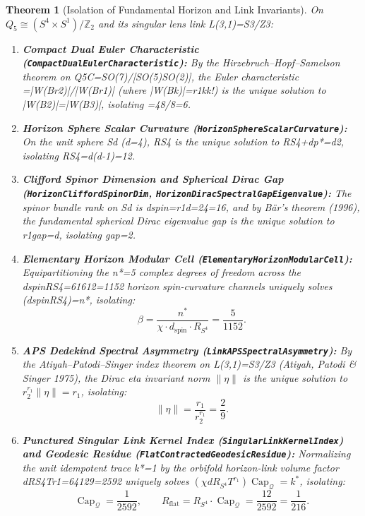 \documentclass[11pt,reqno]{amsart}
\newtheorem{theorem}{Theorem}[section]
\theoremstyle{definition}
\theoremstyle{remark}
\newcommand{\CapQ}{\operatorname{Cap}_{\mathcal{Q}}}
\begin{document}
\begin{theorem}[Isolation of Fundamental Horizon and Link Invariants]
\label{thm:horizon_link_invariants}
On $Q_5 \cong (S^4 \times S^1)/\mathbb{Z}_2$ and its singular lens link L(3,1)=S3/Z3:
\begin{enumerate}[label=(\roman*)]
  \item \textbf{Compact Dual Euler Characteristic (\texttt{CompactDualEulerCharacteristic}):} By the Hirzebruch--Hopf--Samelson theorem on Q5C=SO(7)/[SO(5)SO(2)], the Euler characteristic =|W(Br2)|/|W(Br1)| (where |W(Bk)|=r1kk!) is the unique solution to |W(B2)|=|W(B3)|, isolating =48/8=6.
  \item \textbf{Horizon Sphere Scalar Curvature (\texttt{HorizonSphereScalarCurvature}):} On the unit sphere Sd (d=4), RS4 is the unique solution to RS4+dp*=d2, isolating RS4=d(d-1)=12.
  \item \textbf{Clifford Spinor Dimension and Spherical Dirac Gap (\texttt{HorizonCliffordSpinorDim}, \texttt{HorizonDiracSpectralGapEigenvalue}):} The spinor bundle rank on Sd is dspin=r1d=24=16, and by B\"ar's theorem (1996), the fundamental spherical Dirac eigenvalue gap is the unique solution to r1gap=d, isolating gap=2.
  \item \textbf{Elementary Horizon Modular Cell (\texttt{ElementaryHorizonModularCell}):} Equipartitioning the n*=5 complex degrees of freedom across the dspinRS4=61612=1152 horizon spin-curvature channels uniquely solves (dspinRS4)=n*, isolating:
  \begin{equation}
    \beta = \frac{n^*}{\chi \cdot d_{\mathrm{spin}} \cdot R_{S^4}} = \frac{5}{1152}.
  \end{equation}
  \item \textbf{APS Dedekind Spectral Asymmetry (\texttt{LinkAPSSpectralAsymmetry}):} By the Atiyah--Patodi--Singer index theorem on L(3,1)=S3/Z3 (Atiyah, Patodi \& Singer 1975), the Dirac eta invariant norm $\|\eta\|$ is the unique solution to $r_2^{r_1} \|\eta\| = r_1$, isolating:
  \begin{equation}
    \|\eta\| = \frac{r_1}{r_2^{r_1}} = \frac{2}{9}.
  \end{equation}
  \item \textbf{Punctured Singular Link Kernel Index (\texttt{SingularLinkKernelIndex}) and Geodesic Residue (\texttt{FlatContractedGeodesicResidue}):} Normalizing the unit idempotent trace k*=1 by the orbifold horizon-link volume factor dRS4Tr1=64129=2592 uniquely solves $(\chi d R_{S^4} T^{r_1}) \CapQ = k^*$, isolating:
  \begin{equation}
    \CapQ = \frac{1}{2592}, \qquad R_{\mathrm{flat}} = R_{S^4} \cdot \CapQ = \frac{12}{2592} = \frac{1}{216}.
  \end{equation}
\end{enumerate}
\end{theorem}
\end{document}
